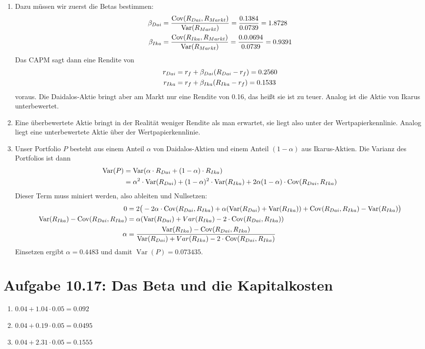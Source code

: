 \documentclass{article}
\DeclareMathOperator{\Var}{Var}
\DeclareMathOperator{\Cov}{Cov}
\begin{document}
\begin{enumerate}[label=(\alph*)]
		\item Dazu müssen wir zuerst die Betas bestimmen:
		\begin{align}
			\beta_{Dai} &= \frac{\Cov(R_{Dai}, R_{Markt})}{\Var(R_{Markt})} = \frac{0.1384}{0.0739} = 1.8728 \notag \\
			\beta_{Ika} &= \frac{\Cov(R_{Ika}, R_{Markt})}{\Var(R_{Markt})} = \frac{0.0.0694}{0.0739} = 0.9391 \notag
		\end{align}
		Das CAPM sagt dann eine Rendite von
		\begin{align}
			r_{Dai} &= r_f + \beta_{Dai}(R_{Dai} - r_f) = 0.2560 \notag \\
			r_{Ika} &= r_f + \beta_{Ika}(R_{Ika} - r_f) = 0.1533 \notag
		\end{align}
		voraus. Die Daidalos-Aktie bringt aber am Markt nur eine Rendite von 0.16, das heißt sie ist zu teuer. Analog ist die Aktie von Ikarus unterbewertet.
		\item Eine überbewertete Aktie bringt in der Realität weniger Rendite als man erwartet, sie liegt also unter der Wertpapierkennlinie. Analog liegt eine unterbewertete Aktie über der Wertpapierkennlinie.
		\item Unser Portfolio $P$ besteht aus einem Anteil $\alpha$ von Daidalos-Aktien und einem Anteil $(1-\alpha)$ aus Ikarus-Aktien. Die Varianz des Portfolios ist dann
		\begin{align}
			\Var(P) &= \Var(\alpha\cdot R_{Dai} + (1-\alpha)\cdot R_{Ika}) \notag \\
			&= \alpha^2\cdot \Var(R_{Dai}) + (1-\alpha)^2\cdot \Var(R_{Ika}) + 2\alpha(1-\alpha)\cdot \Cov(R_{Dai}, R_{Ika}) \notag
		\end{align}
		Dieser Term muss miniert werden, also ableiten und Nullsetzen:
		\begin{align}
			0 &= 2\big(-2\alpha\cdot \Cov(R_{Dai},R_{Ika}) + \alpha(\Var(R_{Dai}) + \Var(R_{Ika})) + \Cov(R_{Dai}, R_{Ika}) - \Var(R_{Ika})\big) \notag \\
			\Var(R_{Ika}) - \Cov(R_{Dai}, R_{Ika}) &= \alpha(\Var(R_{Dai}) + Var(R_{Ika}) - 2\cdot \Cov(R_{Dai}, R_{Ika})) \notag \\
			\alpha &= \frac{\Var(R_{Ika}) - \Cov(R_{Dai}, R_{Ika})}{\Var(R_{Dai}) + Var(R_{Ika}) - 2\cdot \Cov(R_{Dai}, R_{Ika})} \notag
		\end{align}
		Einsetzen ergibt $\alpha = 0.4483$ und damit $\Var(P) = 0.073435$.
	\end{enumerate}

	\section*{Aufgabe 10.17: Das Beta und die Kapitalkosten}
	\begin{enumerate}[label=(\alph*)]
		\item $0.04 + 1.04\cdot 0.05 = 0.092$
		\item $0.04 + 0.19\cdot 0.05 = 0.0495$
		\item $0.04 + 2.31\cdot 0.05 = 0.1555$
	\end{enumerate}
	
\end{document}
